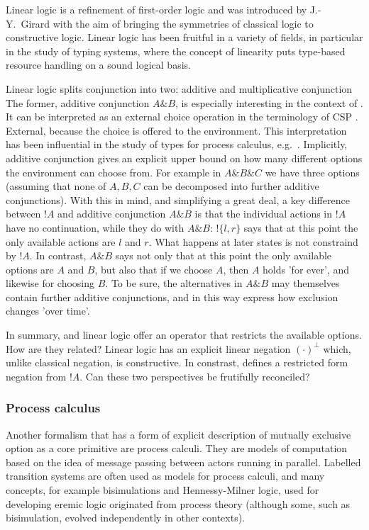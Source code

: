Linear logic \cite{GirardJY:linlog,GirardJY:protyp} is a refinement of
first-order logic and was introduced by J.-Y.~Girard with the aim of
bringing the symmetries of classical logic to constructive
logic. Linear logic has been fruitful in a variety of fields, in
particular in the study of typing systems, where the concept of
linearity puts type-based resource handling on a sound logical basis.

Linear logic splits conjunction into two: additive and multiplicative
conjunction The former, additive conjunction $A \& B$, is especially
interesting in the context of \ELFULL{}. It can be interpreted
\cite{AbramskyS:comintoll} as an external choice operation in the
terminology of CSP \cite{HoareC:comseq}. External, because the choice
is offered to the environment.  This interpretation has been
influential in the study of types for process calculus,
e.g.~\cite{HondaK:unitypsfsifLONG,TakeuchiK:intbaslaits,HondaK:lanpriatdfscbp}.
Implicitly, additive conjunction gives an explicit upper bound on how
many different options the environment can choose from. For example in
$A \& B \& C$ we have three options (assuming that none of $A, B, C$
can be decomposed into further additive conjunctions).  With this in
mind, and simplifying a great deal, a key difference between $!A$ and
additive conjunction $A \& B$ is that the individual actions in $!A$
have no continuation, while they do with $A \& B$: $!\{l, r\}$ says
that at this point the only available actions are $l$ and $r$. What
happens at later states is not constraind by $!A$.  In contrast, $A \&
B$ says not only that at this point the only available options are $A$
and $B$, but also that if we choose $A$, then $A$ holds 'for ever',
and likewise for choosing $B$. To be sure, the alternatives in $A \&
B$ may themselves contain further additive conjunctions, and in this
way express how exclusion changes 'over time'.

In summary, \ELABR{} and linear logic offer an operator that restricts
the available options. How are they related? Linear logic has an
explicit linear negation $(\cdot)^{\bot}$ which, unlike classical
negation, is constructive. In constrast, \ELABR{} defines a restricted
form negation from $!A$. Can these two perspectives be frutifully
reconciled?

\subsubsection{Process calculus}

Another formalism that has a form of explicit description of mutually
exclusive option as a core primitive are process calculi. They are
models of computation based on the idea of message passing between
actors running in parallel. Labelled transition systems are often used
as models for process calculi, and many concepts, for example
bisimulations and Hennessy-Milner logic, used for developing eremic
logic originated from process theory (although some, such as
bisimulation, evolved independently in other contexts).

